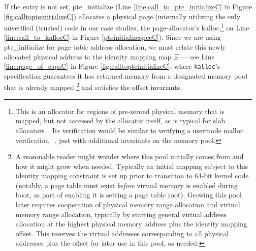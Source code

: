 If the entry is not set, \textsf{pte\_initialize} (Line \ref{line:call_to_pte_initializeC} in Figure \ref{fig:calltopteinitializeC}) 
allocates a physical page (internally utilizing the only unverified (trusted) code in our case studies, the page-allocator's \textsf{kalloc},\footnote{
  This is an allocator for regions of pre-zeroed physical memory that is mapped, but not accessed by the allocator itself,
  as is typical for slab allocators~\cite{bonwick1994slab}.
  Its verification would be similar to verifying a usermode \textsf{malloc} verification ~\cite{Chlipala2013Bedrock,wickerson2010explicit},
  just with additional invariants on the memory pool.
} 
on Line \ref{line:call_to_kallocC} in Figure \ref{pteinitializespecC}). 
Since we are using \textsf{pte\_initialize} for page-table address allocation, we must relate this newly
allocated physical address to the identity mapping map $\Xi$ --- 
see Line \ref{line:page_of_capsC} in Figure \ref{fig:calltopteinitializeC}, where
\texttt{kalloc}'s specification guarantees it has returned memory from a designated memory
pool that is already mapped
\ifPLDI
\else
\footnote{A reasonable reader might wonder where this pool
initially comes from and how it might grow when needed. Typically an initial mapping subject to this identity mapping
constraint is set up prior to transition to 64-bit kernel code (notably,
a page table must exist \emph{before} virtual memory is enabled during boot, as part of enabling it is setting
a page table root).
Growing this pool later requires cooperation of physical memory range allocation and virtual memory range allocation,
typically by starting general virtual address allocation at the highest physical memory address plus the identity mapping offset.
This reserves the virtual addresses corresponding to all physical addresses plus the offset for later use in this pool,
as needed.
} 
\fi
and satisfies the offset invariants.
